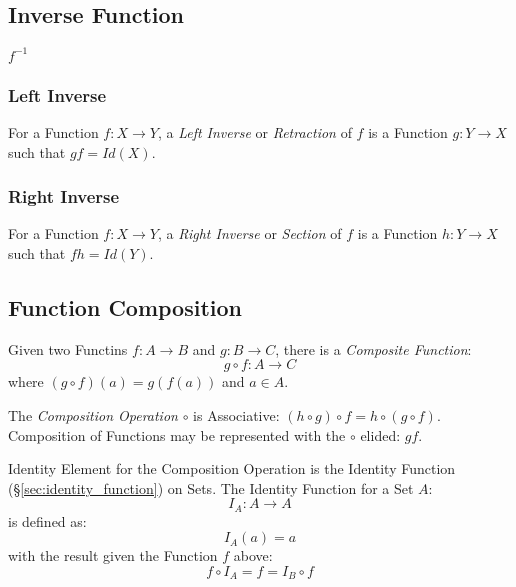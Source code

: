 \subsection{Inverse Function}\label{sec:inverse_function}

$f^{-1}$



\subsubsection{Left Inverse}\label{sec:left_inverse}

For a Function $f: X \rightarrow Y$, a \emph{Left Inverse} or
\emph{Retraction} of $f$ is a Function $g: Y \rightarrow X$ such that
$gf = Id(X)$.



\subsubsection{Right Inverse}\label{sec:right_inverse}

For a Function $f: X \rightarrow Y$, a \emph{Right Inverse} or
\emph{Section} of $f$ is a Function $h: Y \rightarrow X$ such that $fh
= Id(Y)$.



\subsection{Function Composition}\label{sec:function_composition}

Given two Functins $f : A \rightarrow B$ and $g : B \rightarrow C$,
there is a \emph{Composite Function}:
\[
  g \circ f : A \rightarrow C
\]
where $(g \circ f)(a) = g(f(a))$ and $a \in A$.

The \emph{Composition Operation} $\circ$ is Associative: $(h \circ g)
\circ f = h \circ (g \circ f)$. Composition of Functions may be
represented with the $\circ$ elided: $gf$.

Identity Element for the Composition Operation is the Identity
Function (\S\ref{sec:identity_function}) on Sets. The Identity
Function for a Set $A$:
\[
  I_A : A \rightarrow A
\]
is defined as:
\[
  I_A(a) = a
\]
with the result given the Function $f$ above:
\[
  f \circ I_A = f = I_B \circ f
\]



